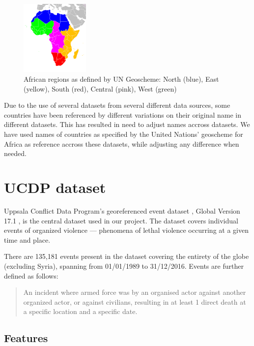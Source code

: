 \documentclass[a4paper,11pt]{article}
\begin{document}
\begin{figure}[ht!]
    \centering
    \includegraphics[width=0.3\textwidth]{images/Africa-regions.png}
    \caption{African regions as defined by UN Geoscheme: North (blue), East (yellow), South (red), Central (pink), West (green)\label{fig:regions}}
\end{figure}

Due to the use of several datasets from several different data sources,
some countries have been referenced by different variations on their
original name in different datasets. This has resulted in need to adjust
names accross datasets. We have used names of countries as specified by
the United Nations' geoscheme for Africa as reference accross these
datasets, while adjusting any difference when needed.

\section{UCDP dataset}

Uppsala Conflict Data Program's georeferenced event dataset \cite{Sundberg:13},
Global Version 17.1 \cite{Codebook2017}, is the central dataset used in our project.
The dataset covers individual events of organized violence --- phenomena of
lethal violence occurring at a given time and place.

There are 135,181 events present in the dataset covering the entirety of
the globe (excluding Syria), spanning from 01/01/1989 to 31/12/2016.
Events are further defined as follows:

\begin{quote}
An incident where armed force was by an organised actor against another
organized actor, or against civilians, resulting in at least 1 direct
death at a specific location and a specific date.
\end{quote}

\subsection{Features}
\end{document}
